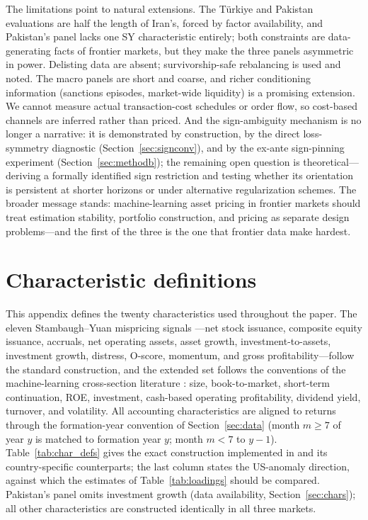 \documentclass[12pt]{article}
\begin{document}
The limitations point to natural extensions. The T\"urkiye and Pakistan evaluations are half the length of Iran's, forced by factor availability, and Pakistan's panel lacks one SY characteristic entirely; both constraints are data-generating facts of frontier markets, but they make the three panels asymmetric in power. Delisting data are absent; survivorship-safe rebalancing is used and noted. The macro panels are short and coarse, and richer conditioning information (sanctions episodes, market-wide liquidity) is a promising extension. We cannot measure actual transaction-cost schedules or order flow, so cost-based channels are inferred rather than priced. And the sign-ambiguity mechanism is no longer a narrative: it is demonstrated by construction, by the direct loss-symmetry diagnostic (Section~\ref{sec:signconv}), and by the ex-ante sign-pinning experiment (Section~\ref{sec:methodb}); the remaining open question is theoretical---deriving a formally identified sign restriction and testing whether its orientation is persistent at shorter horizons or under alternative regularization schemes. The broader message stands: machine-learning asset pricing in frontier markets should treat estimation stability, portfolio construction, and pricing as separate design problems---and the first of the three is the one that frontier data make hardest.

\appendix
\section{Characteristic definitions}\label{app:chars}

This appendix defines the twenty characteristics used throughout the paper. The eleven Stambaugh--Yuan mispricing signals \citep{sy2017}---net stock issuance, composite equity issuance, accruals, net operating assets, asset growth, investment-to-assets, investment growth, distress, O-score, momentum, and gross profitability---follow the standard construction, and the extended set follows the conventions of the machine-learning cross-section literature \citep{gkx2020,cpz2024}: size, book-to-market, short-term continuation, ROE, investment, cash-based operating profitability, dividend yield, turnover, and volatility. All accounting characteristics are aligned to returns through the formation-year convention of Section~\ref{sec:data} (month $m \ge 7$ of year $y$ is matched to formation year $y$; month $m < 7$ to $y-1$). Table~\ref{tab:char_defs} gives the exact construction implemented in  and its country-specific counterparts; the last column states the US-anomaly direction, against which the estimates of Table~\ref{tab:loadings} should be compared. Pakistan's panel omits investment growth (data availability, Section~\ref{sec:chars}); all other characteristics are constructed identically in all three markets.
\end{document}
